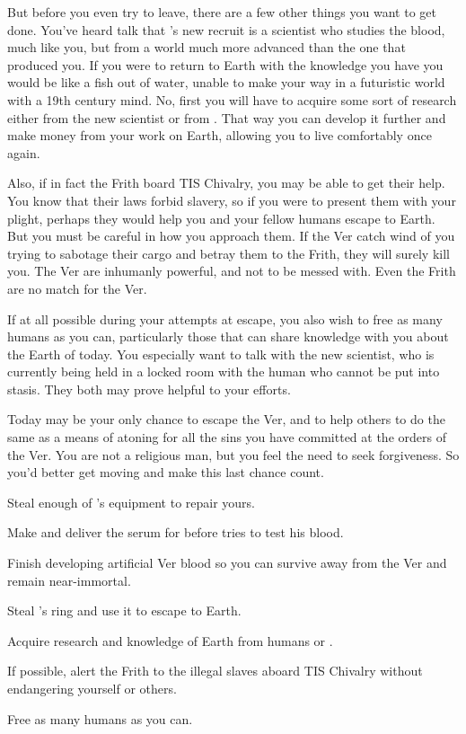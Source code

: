 \documentclass[char]{guildcamp4}
\begin{document}
But before you even try to leave, there are a few other things you want to get done. You've heard talk that \cVone{}'s new recruit is a scientist who studies the blood, much like you, but from a world much more advanced than the one that produced you. If you were to return to Earth with the knowledge you have you would be like a fish out of water, unable to make your way in a futuristic world with a 19th century mind. No, first you will have to acquire some sort of research either from the new scientist or from \cVthree{}. That way you can develop it further and make money from your work on Earth, allowing you to live comfortably once again.

Also, if in fact the Frith board TIS Chivalry, you may be able to get their help. You know that their laws forbid slavery, so if you were to present them with your plight, perhaps they would help you and your fellow humans escape to Earth. But you must be careful in how you approach them. If the Ver catch wind of you trying to sabotage their cargo and betray them to the Frith, they will surely kill you. The Ver are inhumanly powerful, and not to be messed with. Even the Frith are no match for the Ver.

If at all possible during your attempts at escape, you also wish to free as many humans as you can, particularly those that can share knowledge with you about the Earth of today. You especially want to talk with the new scientist, who is currently being held in a locked room with the human who cannot be put into stasis. They both may prove helpful to your efforts.

Today may be your only chance to escape the Ver, and to help others to do the same as a means of atoning for all the sins you have committed at the orders of the Ver. You are not a religious man, but you feel the need to seek forgiveness. So you'd better get moving and make this last chance count.

\begin{itemz}[Goals]
	\item Steal enough of \cVthree{}'s equipment to repair yours.
	\item Make and deliver the serum for \cRasputin{} before \cVthree{} tries to test his blood.
	\item Finish developing artificial Ver blood so you can survive away from the Ver and remain near-immortal.
	\item Steal \cVone{}'s ring and use it to escape to Earth.
	\item Acquire research and knowledge of Earth from humans or \cVthree{}.
	\item If possible, alert the Frith to the illegal slaves aboard TIS Chivalry without endangering yourself or others.
	\item Free as many humans as you can.
\end{itemz}
\end{document}
